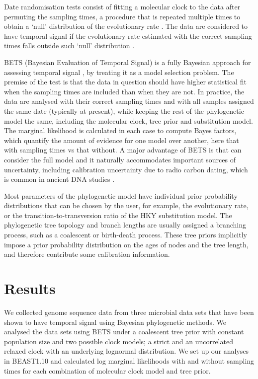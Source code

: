 \documentclass[10pt,letterpaper]{article}
\begin{document}
Date randomisation tests consist of fitting a molecular clock to the data after permuting the sampling times, a procedure that is repeated multiple times to obtain a `null' distribution of the evolutionary rate \cite{ramsden2009hantavirus}. The data are considered to have temporal signal if the evolutionary rate estimated with the correct sampling times falls outside such `null' distribution \cite{ramsden2009hantavirus,duchene2015performance}.

BETS (Bayesian Evaluation of Temporal Signal) is a fully Bayesian approach for assessing temporal signal \cite{duchene2020bayesian}, by treating it as a model selection problem. The premise of the test is that the data in question should have higher statistical fit when the sampling times are included than when they are not. In practice, the data are analysed with their correct sampling times and with all samples assigned the same date (typically at present), while keeping the rest of the phylogenetic model the same, including the molecular clock, tree prior and substitution model. The marginal likelihood is calculated in each case to compute Bayes factors, which quantify the amount of evidence for one model over another, here that with sampling times vs that without. A major advantage of BETS is that can consider the full model and it naturally accommodates important sources of uncertainty, including calibration uncertainty due to radio carbon dating, which is common in ancient DNA studies \cite{molak2015empirical}. 

Most parameters of the phylogenetic model have individual prior probability distributions that can be chosen by the user, for example, the evolutionary rate, or the transition-to-transversion ratio of the HKY substitution model. The phylogenetic tree topology and branch lengths are usually assigned a branching process, such as a coalescent or birth-death process. These tree priors implicitly impose a prior probability distribution on the ages of nodes and the tree length, and therefore contribute some calibration information. 

\section*{Results}
We collected genome sequence data from three microbial data sets that have been shown to have temporal signal using Bayesian phylogenetic methods. We analysed the data sets using BETS under a coalescent tree prior with constant population size and two possible clock models; a strict and an uncorrelated relaxed clock with an underlying lognormal distribution. We set up our analyses in BEAST1.10 \cite{suchard2018bayesian} and calculated log marginal likelihoods with and without sampling times for each combination of molecular clock model and tree prior. 
\end{document}

